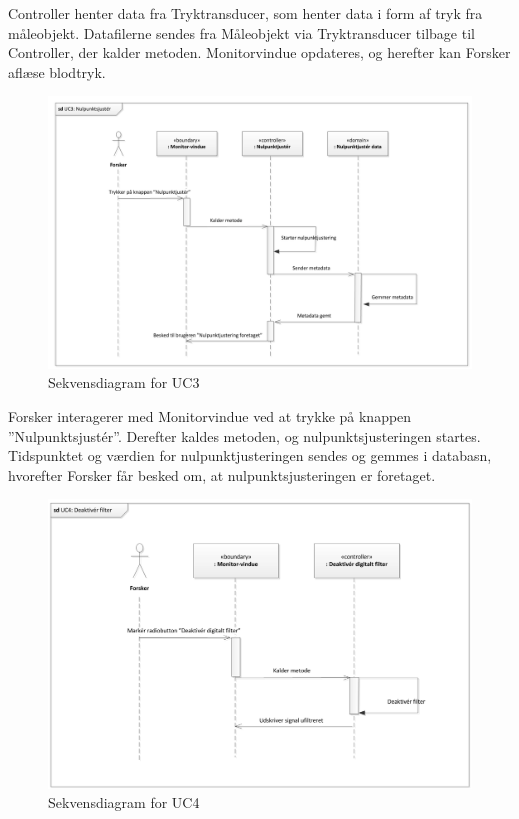 Controller henter data fra Tryktransducer, som henter data i form af tryk fra måleobjekt. Datafilerne sendes fra Måleobjekt via Tryktransducer tilbage til Controller, der kalder metoden. Monitorvindue opdateres, og herefter kan Forsker aflæse blodtryk. 

\begin{figure}[H]
	\centering
	\includegraphics[width=1\textwidth]{Figurer/Snip20151104_33}
	\caption{Sekvensdiagram for UC3}
\end{figure}

Forsker interagerer med Monitorvindue ved at trykke på knappen ”Nulpunktsjustér”. Derefter kaldes metoden, og nulpunktsjusteringen startes. Tidspunktet og værdien for nulpunktjusteringen sendes og gemmes i databasn, hvorefter Forsker får besked om, at nulpunktsjusteringen er foretaget. 

\begin{figure}[H]
	\centering
	\includegraphics[width=1\textwidth]{Figurer/Snip20151104_34}
	\caption{Sekvensdiagram for UC4}
\end{figure}

